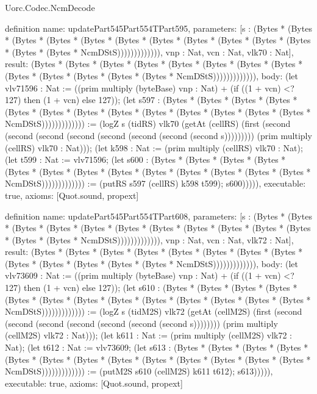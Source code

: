 \begin{lexlean}{Uorc.Codec.NcmDecode}
\begin{semanticmodule}
definition{
  name: updatePart545Part554TPart595,
  parameters: [s : (Bytes * (Bytes * (Bytes * (Bytes * (Bytes * (Bytes * (Bytes * (Bytes * (Bytes * (Bytes * (Bytes * (Bytes * (Bytes * NcmDStS))))))))))))), vnp : Nat, vcn : Nat, vlk70 : Nat],
  result: (Bytes * (Bytes * (Bytes * (Bytes * (Bytes * (Bytes * (Bytes * (Bytes * (Bytes * (Bytes * (Bytes * (Bytes * (Bytes * NcmDStS))))))))))))),
  body: (let vlv71596 : Nat := ((prim multiply (byteBase) vnp : Nat) + (if ((1 + vcn) <? 127) then (1 + vcn) else 127)); (let s597 : (Bytes * (Bytes * (Bytes * (Bytes * (Bytes * (Bytes * (Bytes * (Bytes * (Bytes * (Bytes * (Bytes * (Bytes * (Bytes * NcmDStS))))))))))))) := (logZ s (tidRS) vlk70 (getAt (cellRS) (first (second (second (second (second (second (second (second (second s))))))))) (prim multiply (cellRS) vlk70 : Nat))); (let k598 : Nat := (prim multiply (cellRS) vlk70 : Nat); (let t599 : Nat := vlv71596; (let s600 : (Bytes * (Bytes * (Bytes * (Bytes * (Bytes * (Bytes * (Bytes * (Bytes * (Bytes * (Bytes * (Bytes * (Bytes * (Bytes * NcmDStS))))))))))))) := (putRS s597 (cellRS) k598 t599); s600))))),
  executable: true,
  axioms: [Quot.sound, propext]
}

definition{
  name: updatePart545Part554TPart608,
  parameters: [s : (Bytes * (Bytes * (Bytes * (Bytes * (Bytes * (Bytes * (Bytes * (Bytes * (Bytes * (Bytes * (Bytes * (Bytes * (Bytes * NcmDStS))))))))))))), vnp : Nat, vcn : Nat, vlk72 : Nat],
  result: (Bytes * (Bytes * (Bytes * (Bytes * (Bytes * (Bytes * (Bytes * (Bytes * (Bytes * (Bytes * (Bytes * (Bytes * (Bytes * NcmDStS))))))))))))),
  body: (let vlv73609 : Nat := ((prim multiply (byteBase) vnp : Nat) + (if ((1 + vcn) <? 127) then (1 + vcn) else 127)); (let s610 : (Bytes * (Bytes * (Bytes * (Bytes * (Bytes * (Bytes * (Bytes * (Bytes * (Bytes * (Bytes * (Bytes * (Bytes * (Bytes * NcmDStS))))))))))))) := (logZ s (tidM2S) vlk72 (getAt (cellM2S) (first (second (second (second (second (second (second (second s)))))))) (prim multiply (cellM2S) vlk72 : Nat))); (let k611 : Nat := (prim multiply (cellM2S) vlk72 : Nat); (let t612 : Nat := vlv73609; (let s613 : (Bytes * (Bytes * (Bytes * (Bytes * (Bytes * (Bytes * (Bytes * (Bytes * (Bytes * (Bytes * (Bytes * (Bytes * (Bytes * NcmDStS))))))))))))) := (putM2S s610 (cellM2S) k611 t612); s613))))),
  executable: true,
  axioms: [Quot.sound, propext]
}


\end{semanticmodule}
\end{lexlean}
